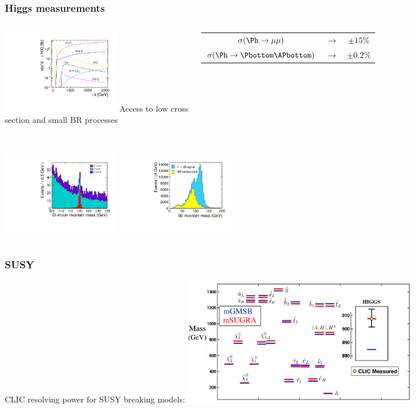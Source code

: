 \documentclass{beamer}
\begin{document}
\begin{frame}
\frametitle{Higgs measurements}
\centering
\begin{columns}[c]
\column{6cm}
\centering
\includegraphics[width=5cm]{xsec_vs_cme}
\column{6cm}
Access to low cross section and small BR processes\\
~\\
\begin{tabular}{ccc}
$\sigma(\Ph\to\mu\mu)$&$\to$ & $\pm15\%$\\
$\sigma(\Ph\to\Pbottom\APbottom)$&$\to$ &$\pm0.2\%$
\end{tabular}
\end{columns}
\begin{columns}[c]
\column{6cm}
\centering
\includegraphics[width=5cm]{ee_h_mumu_mass_mh120GeV}
\column{6cm}
\centering
\includegraphics[width=5cm]{ee_h_bb_mass_mh120GeV}
\end{columns}
\end{frame}

\begin{frame}
\frametitle{SUSY}
CLIC resolving power for SUSY breaking models:
\centering
\includegraphics[width=10cm]{GvM}
\end{frame}
\end{document}
